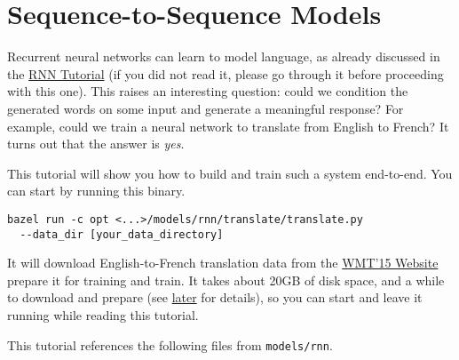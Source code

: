\section{Sequence-to-Sequence Models
}\label{sequence-to-sequence-models}

Recurrent neural networks can learn to model language, as already
discussed in the
\href{tensorflow-zh/SOURCE/tutorials/recurrent/index.md}{RNN Tutorial}
(if you did not read it, please go through it before proceeding with
this one). This raises an interesting question: could we condition the
generated words on some input and generate a meaningful response? For
example, could we train a neural network to translate from English to
French? It turns out that the answer is \emph{yes}.

This tutorial will show you how to build and train such a system
end-to-end. You can start by running this binary.

\begin{verbatim}
bazel run -c opt <...>/models/rnn/translate/translate.py
  --data_dir [your_data_directory]
\end{verbatim}

It will download English-to-French translation data from the
\href{http://www.statmt.org/wmt15/translation-task.html}{WMT'15 Website}
prepare it for training and train. It takes about 20GB of disk space,
and a while to download and prepare (see
\protect\hyperlink{runux5fit}{later} for details), so you can start and
leave it running while reading this tutorial.

This tutorial references the following files from \texttt{models/rnn}.

